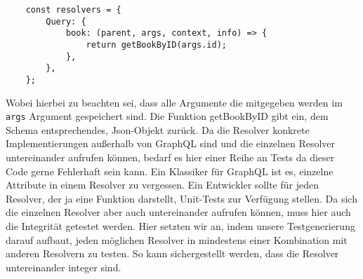 \begin{verbatim}
    const resolvers = {
        Query: {
            book: (parent, args, context, info) => {
                return getBookByID(args.id);
            },
        },
    };
\end{verbatim}

Wobei hierbei zu beachten sei, dass alle Argumente die mitgegeben werden im \verb+args+ Argument gespeichert sind.
Die Funktion getBookByID gibt ein, dem Schema entsprechendes, Json-Objekt zurück.
Da die Resolver konkrete Implementierungen außerhalb von GraphQL sind und die einzelnen Resolver untereinander aufrufen können, bedarf es hier
einer Reihe an Tests da dieser Code gerne Fehlerhaft sein kann.
Ein Klassiker für GraphQL ist es, einzelne Attribute in einem Resolver zu vergessen.
Ein Entwickler sollte für jeden Resolver, der ja eine Funktion darstellt, Unit-Tests zur Verfügung stellen.
Da sich die einzelnen Resolver aber auch untereinander aufrufen können, muss hier auch die Integrität getestet werden.
Hier setzten wir an, indem unsere Testgenerierung darauf aufbaut, jeden möglichen Resolver in mindestens einer Kombination mit anderen Resolvern zu testen.
So kann sichergestellt werden, dass die Resolver untereinander integer sind.







